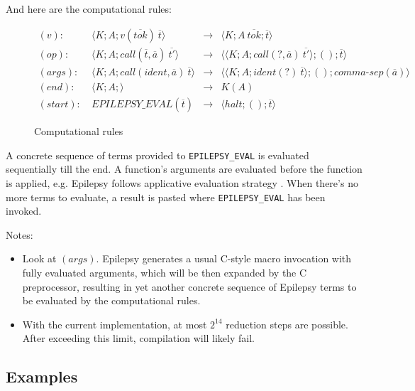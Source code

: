 \documentclass[12pt]{article}
\theoremstyle{break}
\begin{document}
And here are the computational rules:

\begin{figure}[H]
    \caption{Computational rules}

    \begin{align*}
        (v): \ & \langle K; A; v(\overline{tok}) \ \overline{t} \rangle & \to &
            \langle K; A \ \overline{tok}; \overline{t} \rangle \\
        (op): \ & \langle K; A; call(\overline{t}, \overline{a}) \ \overline{t'} \rangle & \to &
            \langle \langle K; A; call(?, \overline{a}) \ \overline{t'} \rangle; (); \overline{t} \rangle \\
        (args): \ & \langle K; A; call(ident, \overline{a}) \ \overline{t} \rangle & \to
            & \langle \langle K; A; ident(?) \ \overline{t} \rangle; (); comma\mbox{-}sep(\overline{a}) \rangle \\
        (end): \ & \langle K; A; \rangle & \to & K(A) \\
        (start): \ & EPILEPSY\_EVAL(\overline{t}) & \to &
            \langle halt; (); \overline{t} \rangle
    \end{align*}
\end{figure}

A concrete sequence of terms provided to \texttt{EPILEPSY\_EVAL} is evaluated sequentially till the end. A function's arguments
are evaluated before the function is applied, e.g. Epilepsy follows applicative
evaluation strategy \cite{ApplicativeEvaluationStrategy}. When there's no more terms
to evaluate, a result is pasted where \texttt{EPILEPSY\_EVAL} has been invoked.

Notes:

\begin{itemize}
    \item Look at $(args)$. Epilepsy generates a usual C-style macro invocation with
    fully evaluated arguments, which will be then expanded by the C preprocessor, resulting
    in yet another concrete sequence of Epilepsy terms to be evaluated by the computational
    rules.
    \item With the current implementation, at most $2^{14}$ reduction steps are
    possible. After exceeding this limit, compilation will likely fail.
\end{itemize}

\subsection{Examples}
\end{document}
